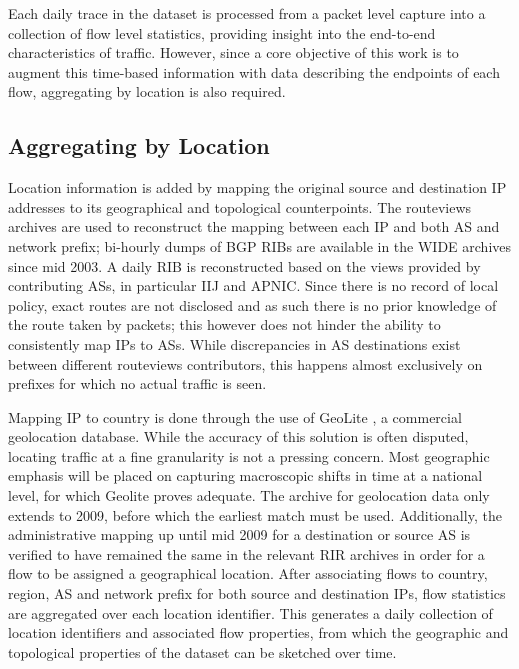 Each daily trace in the dataset is processed from a packet level capture into a collection of flow level statistics, providing insight into the end-to-end characteristics of traffic. 
However, since a core objective of this work is to augment this time-based information with data describing the endpoints of each flow, aggregating by location is also required. 

\subsection{Aggregating by Location}

Location information is added by mapping the original source and destination \ac{IP} addresses to its geographical and topological counterpoints. 
The routeviews archives \cite{routeviews} are used to reconstruct the mapping between each \ac{IP} and both \ac{AS} and network prefix; bi-hourly dumps of \ac{BGP} \acp{RIB} are available in the \acs{WIDE} archives since mid 2003. 
A daily \ac{RIB} is reconstructed based on the views provided by contributing \acp{AS}, in particular \acs{IIJ} and \acs{APNIC}.
Since there is no record of local policy, exact routes are not disclosed and as such there is no prior knowledge of the route taken by packets; this however does not hinder the ability to consistently map \acp{IP} to \acp{AS}.
While discrepancies in \ac{AS} destinations exist between different routeviews contributors, this happens almost exclusively on prefixes for which no actual traffic is seen. 

Mapping \ac{IP} to country is done through the use of GeoLite \cite{maxmind}, a commercial geolocation database. 
While the accuracy of this solution is often disputed, locating traffic at a fine granularity is not a pressing concern.
Most geographic emphasis will be placed on capturing macroscopic shifts in time at a national level, for which Geolite proves adequate.
The archive for geolocation data only extends to 2009, before which the earliest match must be used.
Additionally, the administrative mapping up until mid 2009 for a destination or source \ac{AS} is verified to have remained the same in the relevant \ac{RIR} archives in order for a flow to be assigned a geographical location.
After associating flows to country, region, \ac{AS} and network prefix for both source and destination \acp{IP}, flow statistics are aggregated over each location identifier. 
This generates a daily collection of location identifiers and associated flow properties, from which the geographic and topological properties of the dataset can be sketched over time.
